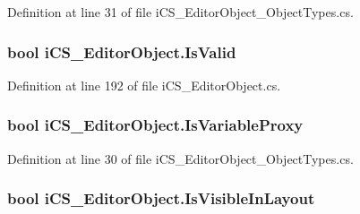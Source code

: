 Definition at line 31 of file i\+C\+S\+\_\+\+Editor\+Object\+\_\+\+Object\+Types.\+cs.

\hypertarget{classi_c_s___editor_object_aa04751488397ad895b430e86b042c364}{
\subsubsection[{Is\+Valid}]{\setlength{\rightskip}{0pt plus 5cm}bool i\+C\+S\+\_\+\+Editor\+Object.\+Is\+Valid\hspace{0.3cm}{\ttfamily [get]}}}\label{classi_c_s___editor_object_aa04751488397ad895b430e86b042c364}


Definition at line 192 of file i\+C\+S\+\_\+\+Editor\+Object.\+cs.

\hypertarget{classi_c_s___editor_object_a76878cc84469e439d67b868d15dc66ca}{
\subsubsection[{Is\+Variable\+Proxy}]{\setlength{\rightskip}{0pt plus 5cm}bool i\+C\+S\+\_\+\+Editor\+Object.\+Is\+Variable\+Proxy\hspace{0.3cm}{\ttfamily [get]}}}\label{classi_c_s___editor_object_a76878cc84469e439d67b868d15dc66ca}


Definition at line 30 of file i\+C\+S\+\_\+\+Editor\+Object\+\_\+\+Object\+Types.\+cs.

\hypertarget{classi_c_s___editor_object_a95534a0a304e183719d91a2d5c11b83c}{
\subsubsection[{Is\+Visible\+In\+Layout}]{\setlength{\rightskip}{0pt plus 5cm}bool i\+C\+S\+\_\+\+Editor\+Object.\+Is\+Visible\+In\+Layout\hspace{0.3cm}{\ttfamily [get]}}}\label{classi_c_s___editor_object_a95534a0a304e183719d91a2d5c11b83c}


